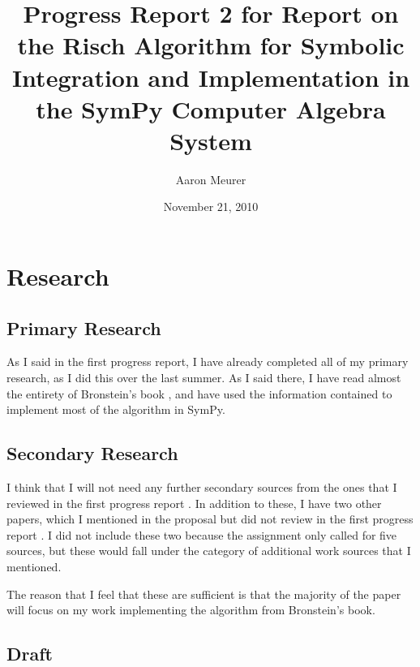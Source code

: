 \documentclass[12pt]{article}
\begin{document}
\title{Progress Report 2 for Report on the Risch Algorithm for Symbolic
Integration and Implementation in the Sym\-Py Computer Algebra System}
\author{Aaron Meurer}
\date{November 21, 2010}
\maketitle


\section{Research}
\subsection{Primary Research}
As I said in the first progress report, I have already completed all of
my primary research, as I did this over the last summer.  As I said
there, I have read almost the entirety of Bronstein's book \cite{bronstein2005symbolic}, and have
used the information contained to implement most of the algorithm in
Sym\-Py.

\subsection{Secondary Research}
I think that I will not need any further secondary sources from the ones
that I reviewed in the first progress report
\cite{bronstein1989simplification, davenport1984integration,
kauers2008integration, moses1971symbolic, risch1969problem}.  In
addition to these, I have two other papers, which I mentioned in the
proposal but did not review in the first progress report
\cite{roach1997meijerg, adamchik1990hypergeometric}.  I did not include
these two because the assignment only called for five sources, but these
would fall under the category of additional work sources that I
mentioned.

The reason that I feel that these are sufficient is that the majority of
the paper will focus on my work implementing the algorithm from
Bronstein's book.

\subsection{Draft}



\end{document}
